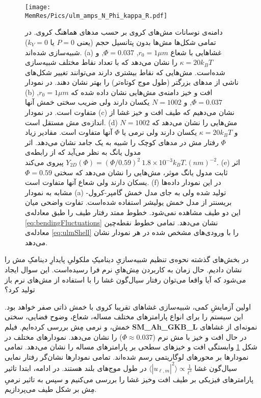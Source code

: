 \begin{figure}[htbp]
\begin{center}
\texttt{[image: \\MemRes/Pics/ulm\_amps\_N\_Phi\_kappa\_R.pdf]}
\caption{
دامنه‌ی نوسانات مش‌های کروی بر حسب مد‌های هماهنگ کروی. در تمامی شکل‌ها مش‌ها بدون پتانسیل‌ حجم (یعنی
$P=0$
یا
$k_V=0$)
 شبیه‌سازی شده‌اند. 
(a)
غشا‌هایی با شعاع
 $r_0=1\mu m$,  $\Phi=0.037$, 
 و
$\kappa=20k_BT$
را نشان می‌دهد که با تعداد نقاط مختلف شبیه‌سازی شده‌است.  مش‌هایی که نقاط بیشتری‌ دارند می‌توانند تغییر شکل‌های ناشی از مد‌های بزرگتر (طول موج کوتاه‌تر) را بهتر نشان دهند. در نمودار
(b)
افت و خیز دامنه‌‌ی مش‌هایی نشان داده شده که 
$r_0=1\mu m$, $\Phi=0.037$,
 و
$N=1002$
یکسان دارند ولی ضریب سختی خمش آنها متفاوت است. در نمودار
(c)
نشان می‌دهیم که طیف افت و خیز غشا از اندازه‌ی مش مستقل است. 
(d)
مش‌هایی را نشان می‌دهد که 
$N=1002$
و
$\kappa=20k_BT$
یکسان دارند ولی نرمی یا 
$\Phi$
آنها متفاوت است. مقادیر زیاد 
 $\Phi$ 
رفتار مش‌ در مدهای کوچک را شبیه به یک جامد نشان می‌دهد. اثر مدول یانگ به نظر می‌آید که از رابطه‌ی
$Y_{2D}(\Phi)=(\Phi/0.59)^2~1.8\times10^{-3}k_BT.(nm)^{-2}$
پیروی می‌کند. 
(e)
اثر ثابت مدول یانگ موثر، مش‌هایی را نشان می‌دهد که سختی
$\Phi=0.59$
یسکان دارند ولی شعاع آنها متفاوت است. 
(f)
در این نمودار داده‌ها مشابه به نمودار 
(a)
تولید شده ولی به جای مدل خمش گامپر-کرول-بریسنتر از مدل خمش یولیشر استفاده شده‌است. تفاوت واضحی میان این دو طیف مشاهده نمی‌شود. خطوط ممتد رفتار طیف را طبق معادله‌ی
\ref{eq:bendingFluctuations}
نشان می‌دهد. تمامی خطوط نقطه‌چین معادله‌ی 
\ref{eq:ulmShell}
را با ورودی‌های مشخص شده در هر نمودار نشان می‌‌دهد.
}
\label{fig:kappaULMS}
\end{center}
\end{figure}

در بخش‌های گذشته نحوه‌ی تنظیم  شبیه‌سازیِ دینامیکِ ملکولیِ پایدارِ دینامکِ مش را نشان دادیم. حال زمان به کاربردن مِش‌هایِ نرم فرا رسیده‌است. این سوال ایجاد می‌شود که آیا واقعا می‌توان رفتار سیال‌گون غشا را با استفاده از مش‌های نرم باز تولید کرد؟

اولین آزمایشِ کمی، شبیه‌سازی غشا‌های تقریبا کروی با خمش ذاتی صفر خواهد بود. این سیستم را برای انواع پارامترهای مختلف مساله، شعاع، وضوح فضایی، سختی خمش، و نرمی مِش بررسی کرده‌ایم. فیلم
{\bf SM\_Ah\_GKB\_L}
نمونه‌ای از غشاهای در حال افت و خیز با مش‌ نرم 
($\Phi\approx0.037$)
را نشان می‌دهد. نمودارهای مختلف در شکل
\ref{fig:kappaULMS}
وابستگی افت و خیز‌های سطحی بر پارامتر‌های مساله را نشان می‌دهد. تمامی نمودار‌ها بر محور‌های لوگاریتمی رسم شده‌اند. تمامی نمودار‌ها  نشان‌گر  رفتار نمایی سیال‌گون غشا
$\langle|u_{\ell,m}|^2\rangle\propto \frac{1}{\ell^4}$
 در طول‌ موج‌های بلند هستند. در ادامه، ابتدا تاثیر پارامتر‌های فیزیکی بر طیف افت وخیز غشا را بررسی می‌کنیم و سپس به تاثیر نرمیِ مِش بر شکل طیف می‌پردازیم.


